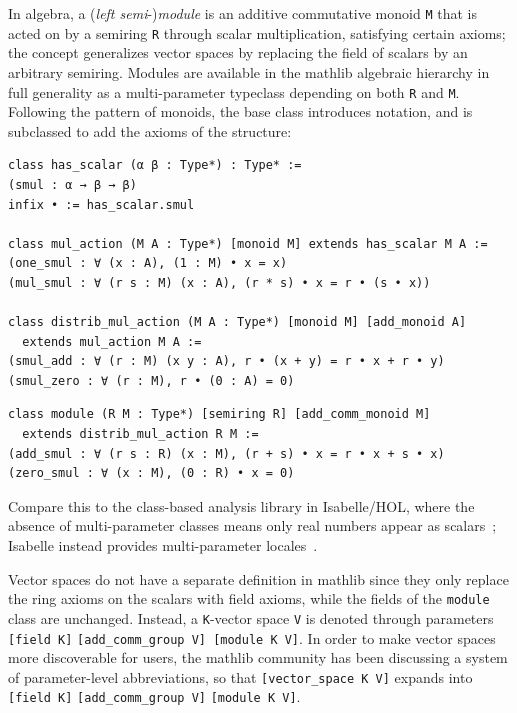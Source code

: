 \documentclass[a4paper,UKenglish,cleveref, autoref, thm-restate]{lipics-v2021}
\newcommand{\mathlib}{\textsf{mathlib}\xspace}
\begin{document}
In algebra, a (\emph{left semi}-)\emph{module} is an additive commutative monoid \lstinline{M} that is acted on by a semiring \lstinline{R} through scalar multiplication,
satisfying certain axioms;
the concept generalizes vector spaces by replacing the field of scalars by an arbitrary semiring.
Modules are available in the \mathlib algebraic hierarchy in full generality as a multi-parameter typeclass depending on both \lstinline{R} and \lstinline{M}.
Following the pattern of monoids, the base class introduces notation, and is subclassed to add the axioms of the structure:
\begin{lstlisting}
class has_scalar (α β : Type*) : Type* :=
(smul : α → β → β)
infix • := has_scalar.smul

class mul_action (M A : Type*) [monoid M] extends has_scalar M A :=
(one_smul : ∀ (x : A), (1 : M) • x = x)
(mul_smul : ∀ (r s : M) (x : A), (r * s) • x = r • (s • x))

class distrib_mul_action (M A : Type*) [monoid M] [add_monoid A]
  extends mul_action M A :=
(smul_add : ∀ (r : M) (x y : A), r • (x + y) = r • x + r • y)
(smul_zero : ∀ (r : M), r • (0 : A) = 0)
\end{lstlisting}
\pagebreak %
\begin{lstlisting}
class module (R M : Type*) [semiring R] [add_comm_monoid M]
  extends distrib_mul_action R M :=
(add_smul : ∀ (r s : R) (x : M), (r + s) • x = r • x + s • x)
(zero_smul : ∀ (x : M), (0 : R) • x = 0)
\end{lstlisting}
Compare this to the class-based analysis library in Isabelle/HOL, where the absence of multi-parameter classes means only real numbers appear as scalars~\cite{Isabelle-HOL-analysis-classes};
Isabelle instead provides multi-parameter locales~\cite{ballarin-locales}.

Vector spaces do not have a separate definition in \mathlib since they only replace the ring axioms on the scalars with field axioms,
while the fields of the \lstinline{module} class are unchanged.
Instead, a \lstinline{K}-vector space \lstinline{V} is denoted through parameters \mbox{\lstinline{[field K]}} \mbox{\lstinline{[add_comm_group V] [module K V]}}.
In order to make vector spaces more discoverable for users,
the \mathlib community has been discussing a system of parameter-level abbreviations,
so that \lstinline{[vector_space K V]} expands into \mbox{\lstinline{[field K]}} \mbox{\lstinline{[add_comm_group V]}} \mbox{\lstinline{[module K V]}}.
\end{document}
